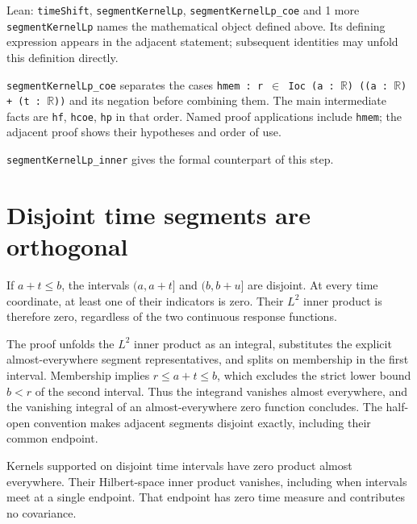 \documentclass[11pt,a4paper]{article}
\begin{document}
\begin{leanbox}{Lean: \texttt{timeShift}, \texttt{segmentKernelLp}, \texttt{segmentKernelLp\_\allowbreak{}coe} and 1 more}
\texttt{segment\allowbreak{}Kernel\allowbreak{}Lp} names the mathematical object defined above. Its defining expression appears in the adjacent statement; subsequent identities may unfold this definition directly.




\texttt{segment\allowbreak{}Kernel\allowbreak{}Lp\_\allowbreak{}coe} separates the cases \texttt{hmem : r \ensuremath{\in} Ioc (a : \ensuremath{\mathbb R}) ((a : \ensuremath{\mathbb R}) + (t : \ensuremath{\mathbb R}))} and its negation before combining them. The main intermediate facts are \texttt{hf}, \texttt{hcoe}, \texttt{hp} in that order. Named proof applications include \texttt{hmem}; the adjacent proof shows their hypotheses and order of use.




\texttt{segment\allowbreak{}Kernel\allowbreak{}Lp\_\allowbreak{}inner} gives the formal counterpart of this step.
\end{leanbox}

\section{\texorpdfstring{Disjoint time segments are orthogonal}{Disjoint time segments are orthogonal}}


If \(a+t\le b\), the intervals \((a,a+t]\) and \((b,b+u]\) are disjoint. At every time coordinate, at least one of their indicators is zero. Their \(L^{2}\) inner product is therefore zero, regardless of the two continuous response functions.



The proof unfolds the \(L^{2}\) inner product as an integral, substitutes the explicit almost-everywhere segment representatives, and splits on membership in the first interval. Membership implies \(r\le a+t\le b\), which excludes the strict lower bound \(b<r\) of the second interval. Thus the integrand vanishes almost everywhere, and the vanishing integral of an almost-everywhere zero function concludes. The half-open convention makes adjacent segments disjoint exactly, including their common endpoint.



Kernels supported on disjoint time intervals have zero product almost everywhere. Their Hilbert-space inner product vanishes, including when intervals meet at a single endpoint. That endpoint has zero time measure and contributes no covariance.
\end{document}
